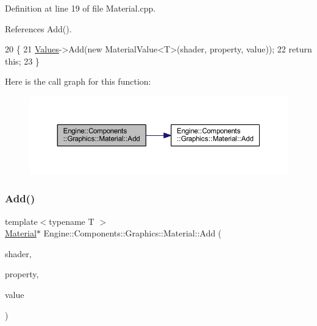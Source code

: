 Definition at line 19 of file Material.\+cpp.



References Add().


\begin{DoxyCode}
20 \{
21     \mbox{\hyperlink{classEngine_1_1Components_1_1Graphics_1_1Material_a34335608ba1e6eb2c2dba5032107eab0}{Values}}->Add(\textcolor{keyword}{new} MaterialValue<T>(shader, property, value));
22     \textcolor{keywordflow}{return} \textcolor{keyword}{this};
23 \}
\end{DoxyCode}
Here is the call graph for this function\+:
\nopagebreak
\begin{figure}[H]
\begin{center}
\leavevmode
\includegraphics[width=350pt]{classEngine_1_1Components_1_1Graphics_1_1Material_aac7709d6bda9b0b16b771fa6530d140e_cgraph}
\end{center}
\end{figure}
\mbox{\label{classEngine_1_1Components_1_1Graphics_1_1Material_ace1e6c024847604594bc4f3d99d0be08}} 
\subsubsection{\texorpdfstring{Add()}{Add()}\hspace{0.1cm}{\footnotesize\ttfamily [2/2]}}
{\footnotesize\ttfamily template$<$typename T $>$ \\
\mbox{\hyperlink{classEngine_1_1Components_1_1Graphics_1_1Material}{Material}}$\ast$ Engine\+::\+Components\+::\+Graphics\+::\+Material\+::\+Add (\begin{DoxyParamCaption}\item[{\mbox{\hyperlink{classEngine_1_1Components_1_1Graphics_1_1Shader}{Shader}} $\ast$}]{shader,  }\item[{const G\+Lchar $\ast$}]{property,  }\item[{T $\ast$}]{value }\end{DoxyParamCaption})}



